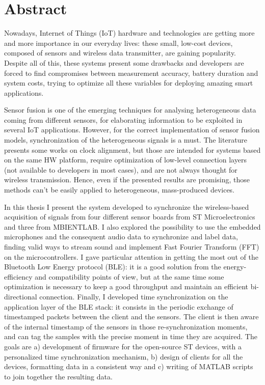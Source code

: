 \chapter*{Abstract}

Nowadays, Internet of Things (IoT) hardware and technologies are getting more and more importance in our everyday lives: these small, low-cost devices, composed of sensors and wireless data transmitter, are gaining popularity. 
Despite all of this, these systems present some drawbacks and developers are forced to find compromises between measurement accuracy, battery duration and system costs, trying to optimize all these variables for deploying amazing smart applications. 

Sensor fusion is one of the emerging techniques for analysing heterogeneous data coming from different sensors, for elaborating information to be exploited in several IoT applications. 
However, for the correct implementation of sensor fusion models, synchronization of the heterogeneous signals is a must. 
The literature presents some works on clock alignment, but those are intended for systems based on the same HW platform, require optimization of low-level connection layers (not available to developers in most cases), and are not always thought for wireless transmission. 
Hence, even if the presented results are promising, those methods can’t be easily applied to heterogeneous, mass-produced devices. 

In this thesis I present the system developed to synchronize the wireless-based acquisition of signals from four different sensor boards from ST Microelectronics and three from MBIENTLAB.
I also explored the possibility to use the embedded microphones and the consequent audio data to synchronize and label data, finding valid ways to stream sound and implement Fast Fourier Transform (FFT) on the microcontrollers. 
I gave particular attention in getting the most out of the Bluetooth Low Energy protocol (BLE): it is a good solution from the energy-efficiency and compatibility points of view, but at the same time some optimization is necessary to keep a good throughput and maintain an efficient bi-directional connection. 
Finally, I developed time synchronization on the application layer of the BLE stack: it consists in the periodic exchange of timestamped packets between the client and the sensors. 
The client is then aware of the internal timestamp of the sensors in those re-synchronization moments, and can tag the samples with the precise moment in time they are acquired. 
The goals are 
a) development of firmware for the open-source ST devices, with a personalized time synchronization mechanism, 
b) design of clients for all the devices, formatting data in a consistent way and 
c) writing of MATLAB scripts to join together the resulting data. 

